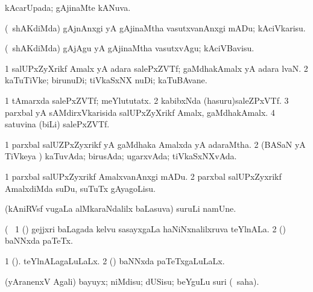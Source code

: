 {{{{{{{{{{{\bentry
{} 
\gl{\gu}
\expl{}
\bmng
 kAcarUpada; gAjinaMte kANuva. 
\emng
\eentry

\bentry 
{} 
\gl{\akirx}
\expl{}
\bmng
 (\kanmu\ shAKdiMda) gAjnAnxgi yA gAjinaMtha vasutxvanAnxgi mADu; kAciVkarisu. 
\emng

\noindent 
\gl{\akirx}
\expl{}
\bmng
 (\kanmu\ shAKdiMda) gAjAgu yA gAjinaMtha vasutxvAgu; kAciVBavisu. 
\emng
\eentry

\bentry 
{} 
\gl{\nA}
\expl{}
\bmng
\bnum
\num{1} salUPxZyXrikf Amalx yA adara salePxZVTf; gaMdhakAmalx yA adara lvaN. 
\num{2} kaTuTiVke; birunuDi; tiVkaSxNX nuDi; kaTuBAvane. 
\enum
\emng

\noindent 
\gl{\pagu}
\expl{}
\bmng
\bnum
\num{1}  tAmarxda salePxZVTf; meYlututatx. 
\num{2}  kabibxNda (hasuru)saleZPxVTf. 
\num{3}  parxbal yA sAMdirxVkarisida salUPxZyXrikf Amalx, gaMdhakAmalx. 
\num{4}  satuvina (biLi) salePxZVTf. 
\enum
\emng
\eentry

\bentry
{} 
\gl{\gu}
\expl{}
\bmng
\bnum
\num{1} parxbal salUZPxZyxrikf yA gaMdhaka Amalxda yA adaraMtha. 
\num{2} (BASaN yA TiVkeya \vi) kaTuvAda; birusAda; ugarxvAda; tiVkaSxNXvAda. 
\enum
\emng
\eentry

\bentry 
{} 
\gl{\sakirx}
\expl{}
\bmng
\bnum
\num{1} parxbal salUPxZyxrikf AmalxvanAnxgi mADu. 
\num{2} parxbal salUPxZyxrikf AmalxdiMda suDu, suTuTx gAyagoLisu. 
\enum
\emng
\eentry

\bentry 
{} 
\gl{\nA}
\expl{}
\bmng
 (kAniRVsf \mo vugaLa alMkaraNdalilx baLasuva) suruLi namUne. 
\emng
\eentry

\bentry 
{} 
\gl{\nA}(\bava\ 
\bmng
\bnum
\num{1} (\savi) gejjxri baLagada kelvu sasayxgaLa haNiNxnalilxruva teYlnALa. 
\num{2} (\pArxvi) baNNxda paTeTx. 
\enum
\emng
\eentry

\bentry 
{} 
\gl{\gu}
\expl{}
\bmng
\bnum
\num{1} (\savi). teYlnALagaLuLaLx. 
\num{2} (\pArxvi) baNNxda paTeTxgaLuLaLx. 
\enum
\emng
\eentry

\bentry
{} 
\gl{\sakirx}
\expl{}
\bmng
 (yAranenxV Agali) bayuyx; niMdisu; dUSisu; beYguLu suri (\akirx\ saha). 
\emng
\eentry

}}}}}}}}}}}
